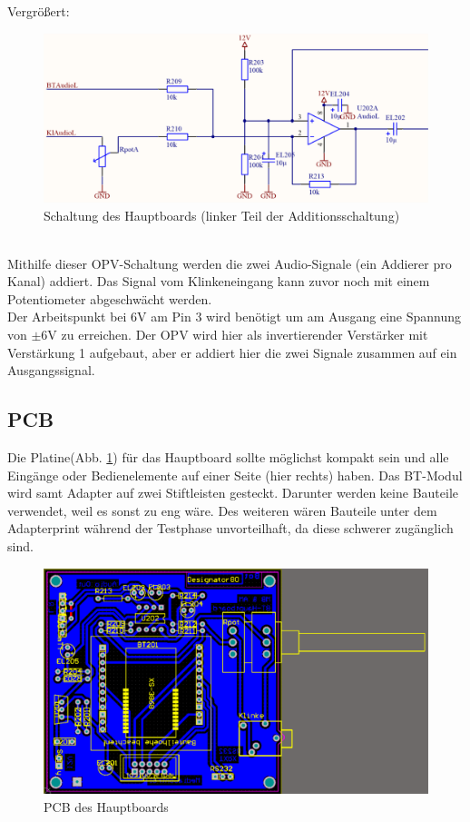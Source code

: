 Vergrößert:
\begin{figure} [h]
	\centering
	\caption{Schaltung des Hauptboards (linker Teil der Additionsschaltung)}
	\includegraphics[width=1\textwidth]{schaltungen/hauptboard_sch2_zoom.png}
\end{figure} \\
Mithilfe dieser OPV-Schaltung werden die zwei Audio-Signale (ein Addierer pro Kanal) addiert. Das Signal vom Klinkeneingang kann zuvor noch mit einem Potentiometer abgeschwächt werden.\\
Der Arbeitspunkt bei 6V am Pin 3 wird benötigt um am Ausgang eine Spannung von $\pm$6V zu erreichen. Der OPV wird hier als invertierender Verstärker mit Verstärkung 1 aufgebaut, aber er addiert hier die zwei Signale zusammen auf ein Ausgangssignal.

\subsection{PCB}
Die Platine(Abb. \ref {fig:abb3.6}) für das Hauptboard sollte möglichst kompakt sein und alle Eingänge oder Bedienelemente auf einer Seite (hier rechts) haben. Das BT-Modul wird samt Adapter auf zwei Stiftleisten gesteckt. Darunter werden keine Bauteile verwendet, weil es sonst zu eng wäre. Des weiteren wären Bauteile unter dem Adapterprint während der Testphase unvorteilhaft, da diese schwerer zugänglich sind.
\begin{figure} [h]
	\centering
	\caption{PCB des Hauptboards}
	\label {fig:abb3.6}
	\includegraphics[width=1\textwidth]{schaltungen/hauptboard_pcb.png}
\end{figure}
\newpage


